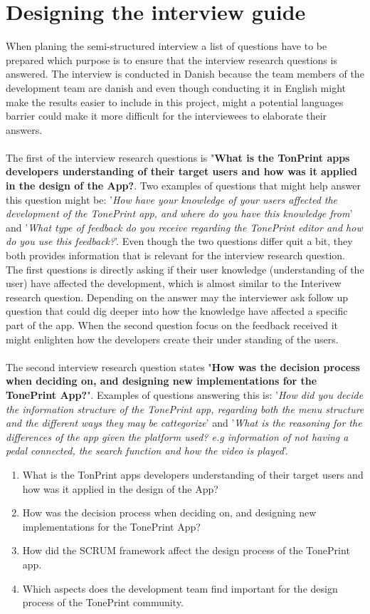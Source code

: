 \section{Designing the interview guide}
\label{InterviewGuide}
When planing the semi-structured interview a list of questions have to be prepared which purpose is to ensure that the interview research questions is answered. The interview is conducted in Danish because the team members of the development team are danish and even though conducting it in English might make the results easier to include in this project, might a potential languages barrier could make it more difficult for the interviewees to elaborate their answers. \\
\\
The first of the interview research questions is "\textbf{What is the TonPrint apps developers understanding of their target users and how was it applied in the design of the App?}. Two examples of questions that might help answer this question might be: '\textit{How have your knowledge of your users affected the development of the TonePrint app, and where do you have this knowledge from}' and '\textit{What type of feedback do you receive regarding the TonePrint editor and how do you use this feedback?}'. Even though the two questions differ quit a bit, they both provides information that is relevant for the interview research question. The first questions is directly asking if their user knowledge (understanding of the user) have affected the development, which is almost similar to the Interivew research question. Depending on the answer may the interviewer ask follow up question that could dig deeper into how the knowledge have affected a specific part of the app. When the second question focus on the feedback received it might enlighten how the developers create their under standing of the users.\\
\\
The second interview research question states "\textbf{How was the decision process when deciding on, and designing new implementations for the TonePrint App?}". Examples of questions answering this is: '\textit{How did you decide the information structure of the TonePrint app, regarding both the menu structure and the different ways they may be cattegorize}' and '\textit{What is the reasoning for the differences of the app given the platform used? e.g information of not having a pedal connected, the search function and how the video is played}'. 


\begin{enumerate}
	\item What is the TonPrint apps developers understanding of their target users and how was it applied in the design of the App?
	\item How was the decision process when deciding on, and designing new implementations for the TonePrint App?
	\item How did the SCRUM framework affect the design process of the TonePrint app.
	\item Which aspects does the development team find important for the design process of the TonePrint community. 
\end{enumerate}

